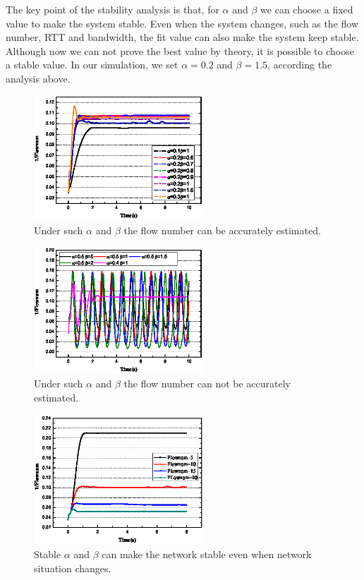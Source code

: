 The key point of the stability analysis is that, for $\alpha$ and $\beta$ we can choose a fixed value to make the system stable. Even when the system changes, such as the flow number, RTT and bandwidth, the fit value can also make the system keep stable. Although now we can not prove the best value by theory, it is possible to choose a stable value. In our simulation, we set $\alpha = 0.2$ and $\beta = 1.5$, according the analysis above.

\begin{figure}[t]
\centering
\includegraphics[width=2.5in]{ab-pic-cut.eps}
\caption{Under such $\alpha$ and $\beta$ the flow number can be accurately estimated.}
\label{fig-ab}
\end{figure}

\begin{figure}[t]
\centering
\includegraphics[width=2.5in]{abwrong-pic-cut.eps}
\caption{Under such $\alpha$ and $\beta$ the flow number can not be accurately estimated.}
\label{fig-abwrong}
\end{figure}

\begin{figure}[t]
\centering
\includegraphics[width=2.5in]{abflownum-pic-cut.eps}
\caption{Stable $\alpha$ and $\beta$ can make the network stable even when network situation changes.}
\label{fig-abflownum}
\end{figure}


